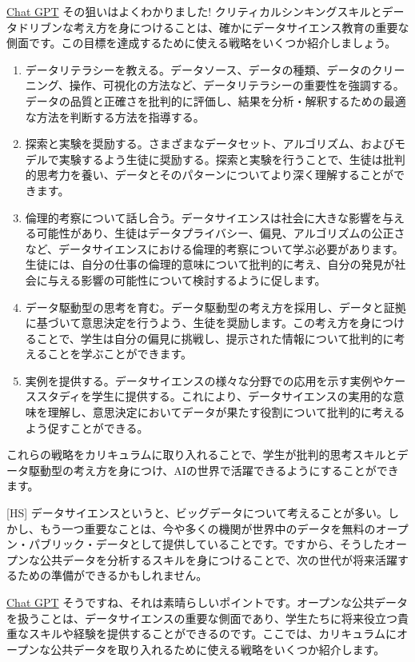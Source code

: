 \documentclass[
]{bxjsbook}
\theoremstyle{definition}
\theoremstyle{definition}
\theoremstyle{definition}
\theoremstyle{definition}
\theoremstyle{remark}
\begin{document}
\protect\hyperlink{chatgpt}{Chat GPT} その狙いはよくわかりました! クリティカルシンキングスキルとデータドリブンな考え方を身につけることは、確かにデータサイエンス教育の重要な側面です。この目標を達成するために使える戦略をいくつか紹介しましょう。

\begin{enumerate}
\def\labelenumi{\arabic{enumi}.}
\item
  データリテラシーを教える。データソース、データの種類、データのクリーニング、操作、可視化の方法など、データリテラシーの重要性を強調する。データの品質と正確さを批判的に評価し、結果を分析・解釈するための最適な方法を判断する方法を指導する。
\item
  探索と実験を奨励する。さまざまなデータセット、アルゴリズム、およびモデルで実験するよう生徒に奨励する。探索と実験を行うことで、生徒は批判的思考力を養い、データとそのパターンについてより深く理解することができます。
\item
  倫理的考察について話し合う。データサイエンスは社会に大きな影響を与える可能性があり、生徒はデータプライバシー、偏見、アルゴリズムの公正さなど、データサイエンスにおける倫理的考察について学ぶ必要があります。生徒には、自分の仕事の倫理的意味について批判的に考え、自分の発見が社会に与える影響の可能性について検討するように促します。
\item
  データ駆動型の思考を育む。データ駆動型の考え方を採用し、データと証拠に基づいて意思決定を行うよう、生徒を奨励します。この考え方を身につけることで、学生は自分の偏見に挑戦し、提示された情報について批判的に考えることを学ぶことができます。
\item
  実例を提供する。データサイエンスの様々な分野での応用を示す実例やケーススタディを学生に提供する。これにより、データサイエンスの実用的な意味を理解し、意思決定においてデータが果たす役割について批判的に考えるよう促すことができる。
\end{enumerate}

これらの戦略をカリキュラムに取り入れることで、学生が批判的思考スキルとデータ駆動型の考え方を身につけ、AIの世界で活躍できるようにすることができます。

{[}HS{]} データサイエンスというと、ビッグデータについて考えることが多い。しかし、もう一つ重要なことは、今や多くの機関が世界中のデータを無料のオープン・パブリック・データとして提供していることです。ですから、そうしたオープンな公共データを分析するスキルを身につけることで、次の世代が将来活躍するための準備ができるかもしれません。

\protect\hyperlink{chatgpt}{Chat GPT} そうですね、それは素晴らしいポイントです。オープンな公共データを扱うことは、データサイエンスの重要な側面であり、学生たちに将来役立つ貴重なスキルや経験を提供することができるのです。ここでは、カリキュラムにオープンな公共データを取り入れるために使える戦略をいくつか紹介します。
\end{document}
